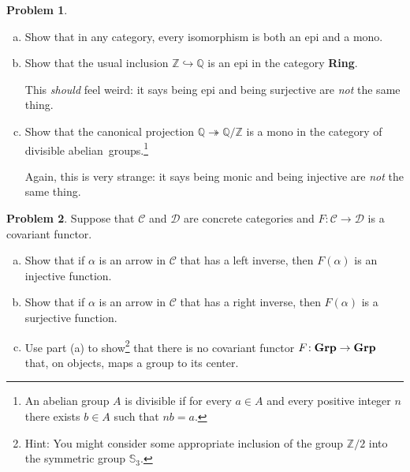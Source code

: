 \documentclass[11pt]{article}
\newcommand{\Z}{\mathbb{Z}}
\theoremstyle{definition}
\newtheorem{problem}{Problem}
\begin{document}
\vfill


\begin{problem}$\,$
\vspace{-0.5em}
		\begin{enumerate}[a)]
		\item Show that in any category, every isomorphism is both an epi and a mono.
				
		\item Show that the usual inclusion $\mathbb{Z} \hookrightarrow \mathbb{Q}$ is an epi in the category {\bf Ring}. 
		
		
		\noindent
		This \emph{should} feel weird: it says being epi and being surjective are \emph{not} the same thing.
		\item Show that the canonical projection $\mathbb{Q} \twoheadrightarrow \mathbb{Q}/\Z$ is a mono in the category of divisible abelian~groups.\footnote{An abelian group $A$ is divisible if for every $a \in A$ and every positive integer $n$ there exists $b \in A$ such that $nb = a$.} 
		
		\noindent
		Again, this is very strange: it says being monic and being injective are \emph{not} the same thing. 
		\end{enumerate}
\end{problem}

\vfill

\begin{problem}
Suppose that $\mathscr{C}$ and $\mathscr{D}$ are concrete categories and $F\!:\mathscr{C} \to \mathscr{D}$ is a covariant functor.
\begin{enumerate}[a)]
\item Show that if $\alpha$ is an arrow in $\mathscr{C}$ that has a left inverse, then $F(\alpha)$ is an injective function.
\item Show that if $\alpha$ is an arrow in $\mathscr{C}$ that has a right inverse, then $F(\alpha)$ is a surjective function.
\item Use part (a) to show\footnote{Hint: You might consider some appropriate inclusion of the group $\Z/2$ into the symmetric group $\mathbb{S}_3$.} that there is no covariant functor $F\!: \textrm{\bf Grp} \to \textrm{\bf Grp}$ that, on objects, maps a group to its center.
\end{enumerate}
\end{problem}

\vfill
\end{document}
